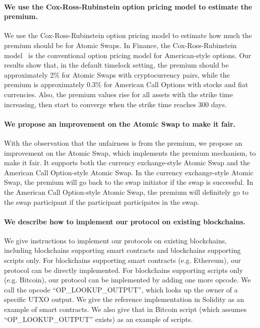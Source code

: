 \paragraph{We use the Cox-Ross-Rubinstein option pricing model to estimate the premium.}
We use the Cox-Ross-Rubinstein option pricing model to estimate how much the premium should be for Atomic Swaps.
In Finance, the Cox-Ross-Rubinstein model~\cite{cox1979option} is the conventional option pricing model for American-style options.
Our results show that, in the default timelock setting, the premium should be approximately 2\% for Atomic Swaps with cryptocurrency pairs, while the premium is approximately $0.3\%$ for American Call Options with stocks and fiat currencies.
Also, the premium values rise for all assets with the strike time increasing, then start to converge when the strike time reaches 300 days.

\paragraph{We propose an improvement on the Atomic Swap to make it fair.}
With the observation that the unfairness is from the premium,
we propose an improvement on the Atomic Swap, which implements the premium mechanism, to make it fair.
It supports both the currency exchange-style Atomic Swap and the American Call Option-style Atomic Swap.
In the currency exchange-style Atomic Swap, the premium will go back to the swap initiator if the swap is successful.
In the American Call Option-style Atomic Swap, the premium will definitely go to the swap participant if the participant participates in the swap.

\paragraph{We describe how to implement our protocol on existing blockchains.}
We give instructions to implement our protocols on existing blockchains,
including blockchains supporting smart contracts and blockchains supporting scripts only.
For blockchains supporting smart contracts (e.g. Ethereum), our protocol can be directly implemented.
For blockchains supporting scripts only (e.g. Bitcoin), our protocol can be implemented by adding one more opcode.
We call the opcode ``OP\_LOOKUP\_OUTPUT'', which looks up the owner of a specific UTXO output.
We give the reference implementation in Solidity as an example of smart contracts.
We also give that in Bitcoin script (which assumes ``OP\_LOOKUP\_OUTPUT'' exists) as an example of scripts.










